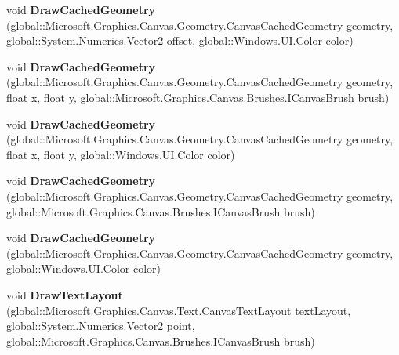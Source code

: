 \begin{DoxyCompactItemize}
void {\bfseries Draw\+Cached\+Geometry} (global\+::\+Microsoft.\+Graphics.\+Canvas.\+Geometry.\+Canvas\+Cached\+Geometry geometry, global\+::\+System.\+Numerics.\+Vector2 offset, global\+::\+Windows.\+U\+I.\+Color color)
\item 
\mbox{\label{interface_microsoft_1_1_graphics_1_1_canvas_1_1_i_canvas_drawing_session_a597dda2fab070afb198c2709fb7b5ed8}} 
void {\bfseries Draw\+Cached\+Geometry} (global\+::\+Microsoft.\+Graphics.\+Canvas.\+Geometry.\+Canvas\+Cached\+Geometry geometry, float x, float y, global\+::\+Microsoft.\+Graphics.\+Canvas.\+Brushes.\+I\+Canvas\+Brush brush)
\item 
\mbox{\label{interface_microsoft_1_1_graphics_1_1_canvas_1_1_i_canvas_drawing_session_adc98a57b53e38c02cfbdeb5b862f5355}} 
void {\bfseries Draw\+Cached\+Geometry} (global\+::\+Microsoft.\+Graphics.\+Canvas.\+Geometry.\+Canvas\+Cached\+Geometry geometry, float x, float y, global\+::\+Windows.\+U\+I.\+Color color)
\item 
\mbox{\label{interface_microsoft_1_1_graphics_1_1_canvas_1_1_i_canvas_drawing_session_a8c31d29ae29bf7dc92f38fdc9c587ca8}} 
void {\bfseries Draw\+Cached\+Geometry} (global\+::\+Microsoft.\+Graphics.\+Canvas.\+Geometry.\+Canvas\+Cached\+Geometry geometry, global\+::\+Microsoft.\+Graphics.\+Canvas.\+Brushes.\+I\+Canvas\+Brush brush)
\item 
\mbox{\label{interface_microsoft_1_1_graphics_1_1_canvas_1_1_i_canvas_drawing_session_a5826731e945620d3a135bfbbc8540c12}} 
void {\bfseries Draw\+Cached\+Geometry} (global\+::\+Microsoft.\+Graphics.\+Canvas.\+Geometry.\+Canvas\+Cached\+Geometry geometry, global\+::\+Windows.\+U\+I.\+Color color)
\item 
\mbox{\label{interface_microsoft_1_1_graphics_1_1_canvas_1_1_i_canvas_drawing_session_a7a501de06ddd18bfa6de42a3ff1974bc}} 
void {\bfseries Draw\+Text\+Layout} (global\+::\+Microsoft.\+Graphics.\+Canvas.\+Text.\+Canvas\+Text\+Layout text\+Layout, global\+::\+System.\+Numerics.\+Vector2 point, global\+::\+Microsoft.\+Graphics.\+Canvas.\+Brushes.\+I\+Canvas\+Brush brush)

\end{DoxyCompactItemize}
